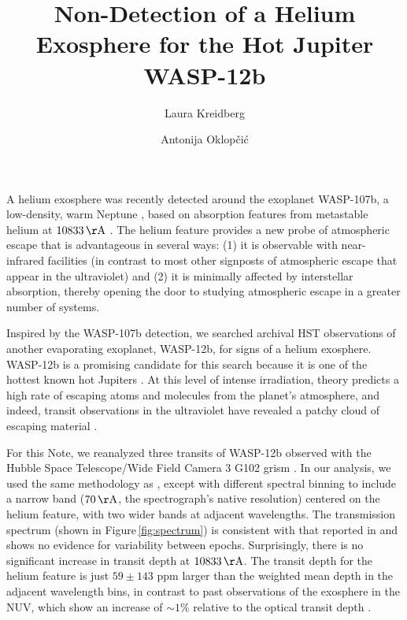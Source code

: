 \documentclass[RNAAS]{aastex62}
\begin{document}
\title{Non-Detection of a Helium Exosphere for the Hot Jupiter WASP-12b}

\author{Laura Kreidberg}

\author{Antonija Oklop\v{c}i\'{c}}
A helium exosphere was recently detected around the exoplanet WASP-107b, a
low-density, warm Neptune \citep{spake18}, based on absorption features from metastable helium at $10833\,\mathrm{\AA}$ \citep[predicted
by][]{seager00,oklopcic18}. The helium feature provides a new probe of atmospheric escape that is
advantageous in several ways: (1) it is observable with near-infrared facilities
(in contrast to most other signposts of atmospheric escape that appear in the
ultraviolet) and (2) it is minimally affected by interstellar absorption,
thereby opening the door to studying atmospheric escape in a greater number of systems.

Inspired by the WASP-107b detection, we searched archival HST observations of
another evaporating exoplanet, WASP-12b, for signs of a helium exosphere.
WASP-12b is a promising 
candidate for this search because it is one of the hottest known hot
Jupiters \citep[$T_\mathrm{eq} = 2500$ K;][]{hebb09}. At this level of intense
irradiation, theory predicts a high rate of escaping atoms and molecules from
the planet's atmosphere, and indeed, transit observations in the ultraviolet
have revealed a patchy cloud of escaping material \citep{nichols15, salz16}.  

For this Note, we reanalyzed three transits of WASP-12b observed with the
Hubble Space Telescope/Wide Field Camera 3 G102 grism \citep[originally published in][]{kreidberg15b}.  In our analysis, we used the same methodology as
\cite{kreidberg15b}, except with different spectral binning to include a narrow
band ($70\,\mathrm{\AA}$, the spectrograph's native resolution) centered on the
helium feature, with two wider bands at adjacent wavelengths. 
The transmission spectrum (shown in Figure\,\ref{fig:spectrum}) is consistent with that reported in
\cite{kreidberg15b} and shows no evidence for variability between epochs.  Surprisingly, there
is no significant increase in transit depth at $10833\,\mathrm{\AA}$. The
transit depth for the helium feature is just $59 \pm 143$ ppm larger than the
weighted mean depth in the adjacent wavelength bins, in contrast to past
observations of the exosphere in the NUV, which show an increase of $\sim1\%$
relative to the optical transit depth \citep{nichols15}.
\end{document}
